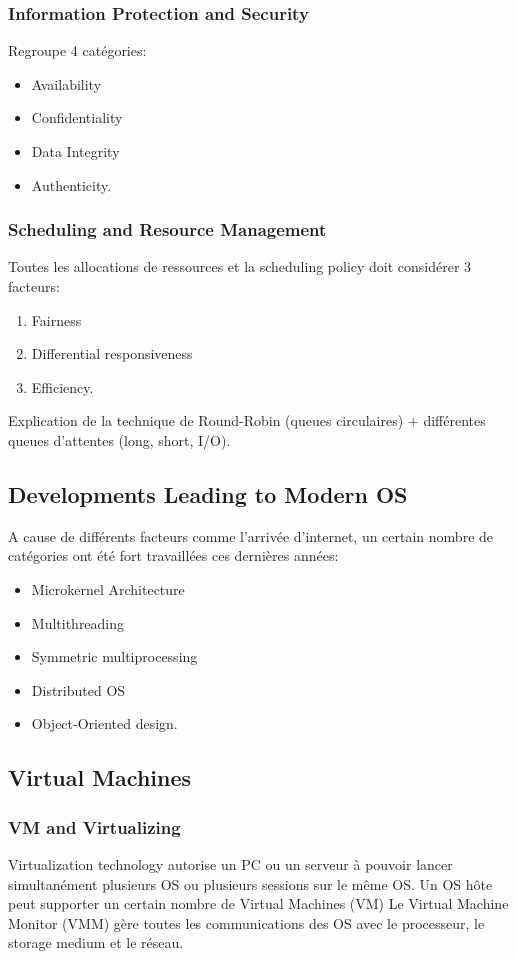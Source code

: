 \subsubsection{Information Protection and Security}
Regroupe 4 catégories:
\begin{itemize}
  \item Availability
  \item Confidentiality
  \item Data Integrity
  \item Authenticity.
\end{itemize}

\subsubsection{Scheduling and Resource Management}
Toutes les allocations de ressources et la scheduling policy doit considérer 3 facteurs:
\begin{enumerate}
  \item Fairness
  \item Differential responsiveness
  \item Efficiency.
\end{enumerate}
Explication de la technique de Round-Robin (queues circulaires) + différentes queues d'attentes (long, short, I/O).

\subsection{Developments Leading to Modern OS}
A cause de différents facteurs comme l'arrivée d'internet, un certain nombre de catégories ont été fort travaillées ces dernières années: \\
\begin{itemize}
  \item Microkernel Architecture
  \item Multithreading
  \item Symmetric multiprocessing
  \item Distributed OS
  \item Object-Oriented design.
\end{itemize}

\subsection{Virtual Machines}

\subsubsection{VM and Virtualizing}
Virtualization technology autorise un PC ou un serveur à pouvoir lancer simultanément plusieurs OS ou plusieurs sessions sur le même OS.
Un OS hôte peut supporter un certain nombre de Virtual Machines (VM)
Le Virtual Machine Monitor (VMM) gère toutes les communications des OS avec le processeur, le storage medium et le réseau.

